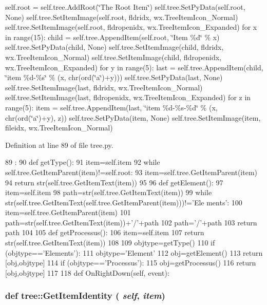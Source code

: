 self.root = self.tree.AddRoot(\char`\"{}The Root Item\char`\"{}) self.tree.SetPyData(self.root, None) self.tree.SetItemImage(self.root, fldridx, wx.TreeItemIcon\_\-Normal) self.tree.SetItemImage(self.root, fldropenidx, wx.TreeItemIcon\_\-Expanded) for x in range(15): child = self.tree.AppendItem(self.root, \char`\"{}Item \%d\char`\"{} \% x) self.tree.SetPyData(child, None) self.tree.SetItemImage(child, fldridx, wx.TreeItemIcon\_\-Normal) self.tree.SetItemImage(child, fldropenidx, wx.TreeItemIcon\_\-Expanded) for y in range(5): last = self.tree.AppendItem(child, \char`\"{}item \%d-\/\%s\char`\"{} \% (x, chr(ord(\char`\"{}a\char`\"{})+y))) self.tree.SetPyData(last, None) self.tree.SetItemImage(last, fldridx, wx.TreeItemIcon\_\-Normal) self.tree.SetItemImage(last, fldropenidx, wx.TreeItemIcon\_\-Expanded) for z in range(5): item = self.tree.AppendItem(last, \char`\"{}item \%d-\/\%s-\/\%d\char`\"{} \% (x, chr(ord(\char`\"{}a\char`\"{})+y), z)) self.tree.SetPyData(item, None) self.tree.SetItemImage(item, fileidx, wx.TreeItemIcon\_\-Normal) 

Definition at line 89 of file tree.py.


\begin{DoxyCode}
89                      :
90         def getType():
91             item=self.item
92             while self.tree.GetItemParent(item)!=self.root:
93                 item=self.tree.GetItemParent(item)
94             return str(self.tree.GetItemText(item))
95 
96         def getElement():
97             item=self.item
98             path=str(self.tree.GetItemText(item))
99             while str(self.tree.GetItemText(self.tree.GetItemParent(item)))!='Ele
      ments':
100                 item=self.tree.GetItemParent(item)
101                 path=str(self.tree.GetItemText(item))+'/'+path
102             path='/'+path
103             return path
104 
105         def getProcessus():
106             item=self.item
107             return str(self.tree.GetItemText(item))
108 
109         objtype=getType()
110         if (objtype=='Elements'):
111             objtype='Element'
112             obj=getElement()        
113             return [obj,objtype]
114         if (objtype=='Processus'):
115             obj=getProcessus()
116             return [obj,objtype]
117 
118 
    def OnRightDown(self, event):
\end{DoxyCode}
\hypertarget{namespacetree_ac5136a690dd5671aff175511c1e8b269}{
\subsubsection[{GetItemIdentity}]{\setlength{\rightskip}{0pt plus 5cm}def tree::GetItemIdentity ( {\em self}, \/   {\em item})}}
\label{namespacetree_ac5136a690dd5671aff175511c1e8b269}


